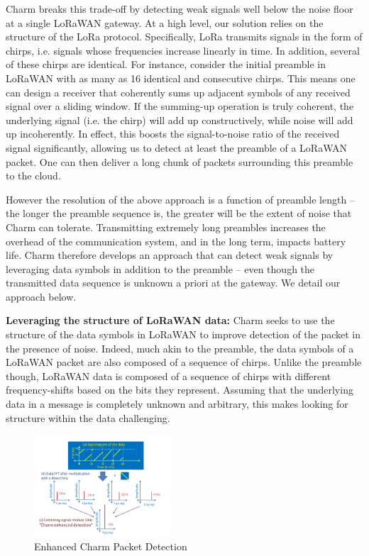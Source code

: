 Charm breaks this trade-off by detecting weak signals well below the noise
floor at a single LoRaWAN gateway. At a high level, our solution relies on the
structure of the LoRa protocol. Specifically, LoRa transmits signals in
the form of chirps, i.e. signals whose frequencies increase linearly in time.
In addition, several of these chirps are identical. For instance, consider the
initial preamble  in LoRaWAN with as many as 16 identical and consecutive
chirps. This means one can design a receiver that coherently sums up adjacent
symbols of any received signal over a sliding window. If the summing-up
operation is truly coherent, the underlying signal (i.e. the chirp) will add
up constructively, while noise will add up incoherently. In effect, this
boosts the signal-to-noise ratio of the received signal significantly,
allowing us to detect at least the preamble of a LoRaWAN packet. One can then
deliver a long chunk of packets surrounding this preamble to the cloud.

However the resolution of the above approach is a function of preamble length
-- the longer the preamble sequence is, the greater will be the extent of
noise that Charm can tolerate. Transmitting extremely long preambles increases
the overhead of the communication system, and in the long term, impacts
battery life. Charm therefore develops an approach that can detect weak
signals by leveraging data symbols in addition to the preamble -- even though
the transmitted data sequence is unknown a priori at the gateway. We detail
our approach below. \vspace*{0.1in}

\noindent \textbf{Leveraging the structure of LoRaWAN data: } Charm seeks to
use the structure of the data symbols in LoRaWAN to improve detection of the
packet in the presence of noise. Indeed, much akin to the preamble, the data
symbols of a LoRaWAN packet are also composed of a sequence of chirps. Unlike
the preamble though, LoRaWAN data is composed of a sequence of chirps with
different frequency-shifts based on the bits they represent. Assuming that the
underlying data in a message is completely unknown and arbitrary, this makes
looking for structure within the data challenging.


\begin{figure}
    \centering
    \includegraphics[width=0.45\textwidth]{figures/CharmEnhancedDetection.pdf}
        \vspace*{-0.1in}
    \caption{Enhanced Charm Packet Detection}
    \label{fig:enhanced_charm}
    \compactimg
\end{figure}

